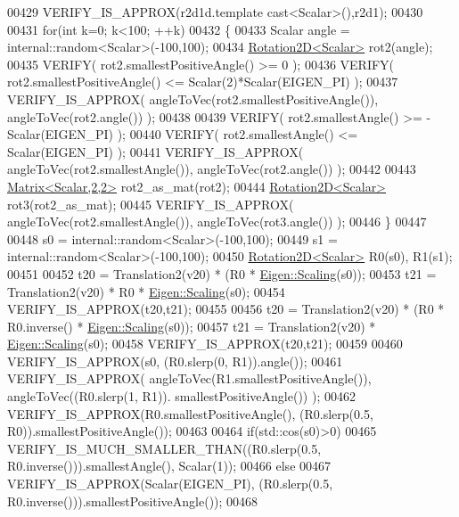 \begin{DoxyCode}
00429   VERIFY\_IS\_APPROX(r2d1d.template cast<Scalar>(),r2d1);
00430   
00431   \textcolor{keywordflow}{for}(\textcolor{keywordtype}{int} k=0; k<100; ++k)
00432   \{
00433     Scalar angle = internal::random<Scalar>(-100,100);
00434     \hyperlink{group___geometry___module_class_eigen_1_1_rotation2_d}{Rotation2D<Scalar>} rot2(angle);
00435     VERIFY( rot2.smallestPositiveAngle() >= 0 );
00436     VERIFY( rot2.smallestPositiveAngle() <= Scalar(2)*Scalar(EIGEN\_PI) );
00437     VERIFY\_IS\_APPROX( angleToVec(rot2.smallestPositiveAngle()), angleToVec(rot2.angle()) );
00438     
00439     VERIFY( rot2.smallestAngle() >= -Scalar(EIGEN\_PI) );
00440     VERIFY( rot2.smallestAngle() <=  Scalar(EIGEN\_PI) );
00441     VERIFY\_IS\_APPROX( angleToVec(rot2.smallestAngle()), angleToVec(rot2.angle()) );
00442 
00443     \hyperlink{group___core___module_class_eigen_1_1_matrix}{Matrix<Scalar,2,2>} rot2\_as\_mat(rot2);
00444     \hyperlink{group___geometry___module_class_eigen_1_1_rotation2_d}{Rotation2D<Scalar>} rot3(rot2\_as\_mat);
00445     VERIFY\_IS\_APPROX( angleToVec(rot2.smallestAngle()),  angleToVec(rot3.angle()) );
00446   \}
00447 
00448   s0 = internal::random<Scalar>(-100,100);
00449   s1 = internal::random<Scalar>(-100,100);
00450   \hyperlink{group___geometry___module_class_eigen_1_1_rotation2_d}{Rotation2D<Scalar>} R0(s0), R1(s1);
00451   
00452   t20 = Translation2(v20) * (R0 * \hyperlink{group___geometry___module_ga23a8ed57e3f2973526026765ae697761}{Eigen::Scaling}(s0));
00453   t21 = Translation2(v20) * R0 * \hyperlink{group___geometry___module_ga23a8ed57e3f2973526026765ae697761}{Eigen::Scaling}(s0);
00454   VERIFY\_IS\_APPROX(t20,t21);
00455   
00456   t20 = Translation2(v20) * (R0 * R0.inverse() * \hyperlink{group___geometry___module_ga23a8ed57e3f2973526026765ae697761}{Eigen::Scaling}(s0));
00457   t21 = Translation2(v20) * \hyperlink{group___geometry___module_ga23a8ed57e3f2973526026765ae697761}{Eigen::Scaling}(s0);
00458   VERIFY\_IS\_APPROX(t20,t21);
00459   
00460   VERIFY\_IS\_APPROX(s0, (R0.slerp(0, R1)).angle());
00461   VERIFY\_IS\_APPROX( angleToVec(R1.smallestPositiveAngle()), angleToVec((R0.slerp(1, R1)).
      smallestPositiveAngle()) );
00462   VERIFY\_IS\_APPROX(R0.smallestPositiveAngle(), (R0.slerp(0.5, R0)).smallestPositiveAngle());
00463 
00464   \textcolor{keywordflow}{if}(std::cos(s0)>0)
00465     VERIFY\_IS\_MUCH\_SMALLER\_THAN((R0.slerp(0.5, R0.inverse())).smallestAngle(), Scalar(1));
00466   \textcolor{keywordflow}{else}
00467     VERIFY\_IS\_APPROX(Scalar(EIGEN\_PI), (R0.slerp(0.5, R0.inverse())).smallestPositiveAngle());
00468   

\end{DoxyCode}
